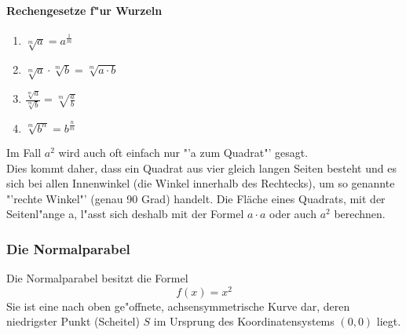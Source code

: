 \paragraph{Rechengesetze f"ur Wurzeln}
\begin{enumerate}
	\item $\sqrt[m]{a} = a^{\frac{1}{m}}$
	\item $\sqrt[m]{a} \cdot \sqrt[m]{b} = \sqrt[m]{a \cdot b}$
	\item $\frac{\sqrt[m]{a}}{\sqrt[m]{b}} = \sqrt[m]{\frac{a}{b}}$
	\item $\sqrt[m]{b^n} = b^{\frac{n}{m}}$
\end{enumerate}\vline

\noindent Im Fall $a^2$ wird auch oft einfach nur "'a zum Quadrat"' gesagt.\\
Dies kommt daher, dass ein Quadrat aus vier gleich langen Seiten besteht und es sich bei allen Innenwinkel (die Winkel innerhalb des Rechtecks), um so genannte "'rechte Winkel"' (genau 90 Grad) handelt. Die Fläche eines Quadrats, mit der Seitenl"ange a, l"asst sich deshalb mit der Formel $a \cdot a$ oder auch $a^2$ berechnen.

\subsubsection{Die Normalparabel}
Die Normalparabel besitzt die Formel 
\begin{equation*}
f(x) = x^2
\end{equation*}
Sie ist eine nach oben ge"offnete, achsensymmetrische Kurve dar, deren niedrigster Punkt (Scheitel) $S$ im Ursprung des Koordinatensystems $(0,0)$ liegt.


